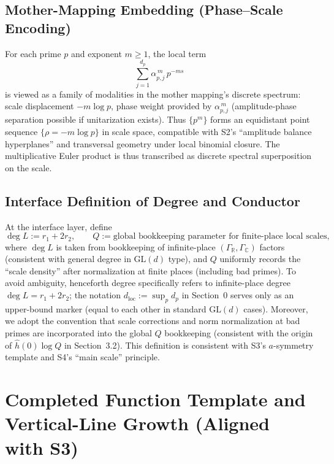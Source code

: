 \documentclass[11pt,a4paper]{article}
\theoremstyle{remark}
\begin{document}
\subsection{Mother-Mapping Embedding (Phase--Scale Encoding)}

For each prime $p$ and exponent $m\ge1$, the local term
\begin{equation}
\sum_{j=1}^{d_p}\alpha_{p,j}^{\,m}\,p^{-ms}
\end{equation}
is viewed as a family of modalities in the mother mapping's discrete spectrum: scale displacement $-m\log p$, phase weight provided by $\alpha_{p,j}^{\,m}$ (amplitude-phase separation possible if unitarization exists). Thus $\{p^m\}$ forms an equidistant point sequence $\{\rho=-m\log p\}$ in scale space, compatible with S2's ``amplitude balance hyperplanes'' and transversal geometry under local binomial closure. The multiplicative Euler product is thus transcribed as discrete spectral superposition on the scale.

\subsection{Interface Definition of Degree and Conductor}

At the interface layer, define
\begin{equation}
\deg L:=r_1+2r_2,\qquad
Q:=\text{global bookkeeping parameter for finite-place local scales},
\end{equation}
where $\deg L$ is taken from bookkeeping of infinite-place $(\Gamma_{\mathbb{R}},\Gamma_{\mathbb{C}})$ factors (consistent with general degree in $\mathrm{GL}(d)$ type), and $Q$ uniformly records the ``scale density'' after normalization at finite places (including bad primes). To avoid ambiguity, henceforth degree specifically refers to infinite-place degree $\deg L=r_1+2r_2$; the notation $d_{\mathrm{loc}}:=\sup_p d_p$ in Section~0 serves only as an upper-bound marker (equal to each other in standard $\mathrm{GL}(d)$ cases). Moreover, we adopt the convention that scale corrections and norm normalization at bad primes are incorporated into the global $Q$ bookkeeping (consistent with the origin of $\widehat{h}(0)\log Q$ in Section~3.2). This definition is consistent with S3's $a$-symmetry template and S4's ``main scale'' principle.

\section{Completed Function Template and Vertical-Line Growth (Aligned with S3)}
\end{document}
